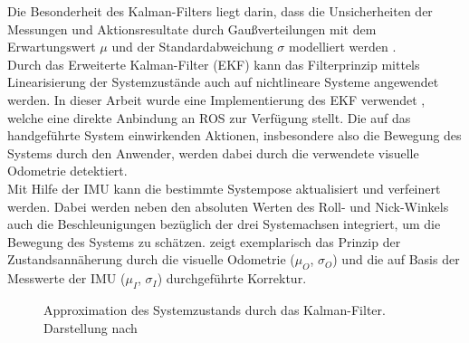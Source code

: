 Die Besonderheit des Kalman-Filters liegt darin, dass die Unsicherheiten der Messungen und Aktionsresultate durch Gaußverteilungen mit dem Erwartungswert $\mu$ und der Standardabweichung $\sigma$ modelliert werden \cite{Hertzberg2012}.\\
Durch das Erweiterte Kalman-Filter (EKF) kann das Filterprinzip mittels Linearisierung der Systemzustände auch auf nichtlineare Systeme angewendet werden. In dieser Arbeit wurde eine Implementierung des EKF verwendet \cite{EKF}, welche eine direkte Anbindung an ROS zur Verfügung stellt. Die auf das handgeführte System einwirkenden Aktionen, insbesondere also die Bewegung des Systems durch den Anwender, werden dabei durch die verwendete visuelle Odometrie detektiert.\\
Mit Hilfe der IMU kann die bestimmte Systempose aktualisiert und verfeinert werden. Dabei werden neben den absoluten Werten des Roll- und Nick-Winkels auch die Beschleunigungen bezüglich der drei Systemachsen integriert, um die Bewegung des Systems zu schätzen.  zeigt
exemplarisch das Prinzip der Zustandsannäherung durch die visuelle Odometrie ($\mu_O$, $\sigma_O$) und die auf Basis der Messwerte der IMU ($\mu_I$, $\sigma_I$) durchgeführte Korrektur.
%
\begin{figure}[ht]
	\begin{center}%
		\caption{Approximation des Systemzustands durch das Kalman-Filter. Darstellung nach \cite{Hertzberg2012}}
		\label{fig.kalman}
	\end{center}
	\vspace*{-8mm}
\end{figure}





